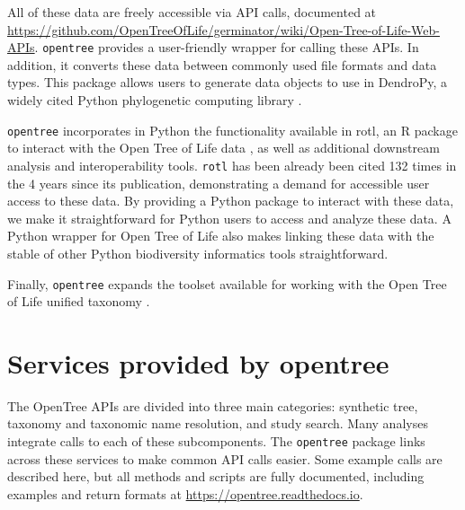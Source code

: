 \documentclass[oupdraft]{sysbio_sse}
\begin{document}
All of these data are freely accessible via API calls, documented at \url{https://github.com/OpenTreeOfLife/germinator/wiki/Open-Tree-of-Life-Web-APIs}.
\texttt{opentree}  provides a user-friendly wrapper for calling these APIs.
In addition, it converts these data between commonly used file formats and data types.
This package allows users to generate data objects to use in DendroPy, a widely cited Python phylogenetic computing library \citep{sukumaran_dendropy_2010}.


\texttt{opentree} incorporates in Python the functionality available in rotl, an {R} package to interact with the Open Tree of Life data \citep{michonneau_rotl_2016}, as well as additional downstream analysis and interoperability tools.
\texttt{rotl} has been already been cited 132 times in the 4 years since its publication, demonstrating a demand for accessible user access to these data.
By providing a Python package to interact with these data, we make it straightforward for Python users to access and analyze these data.
A Python wrapper for Open Tree of Life also makes linking these data with the stable of other Python biodiversity informatics tools straightforward.

Finally, \texttt{opentree} expands the toolset available for working with the Open Tree of Life unified taxonomy \citep{rees_automated_2017}.


\bigskip
\section{Services provided by opentree}
\label{sec3}


The OpenTree APIs are divided into three main categories: synthetic tree,  taxonomy and taxonomic name resolution, and study search.
Many analyses integrate calls to each of these subcomponents.
The \texttt{opentree} package links across these services to make common API calls easier.
Some example calls are described here, but all methods and scripts are fully documented, including examples and return formats at \url{https://opentree.readthedocs.io}.
\end{document}
